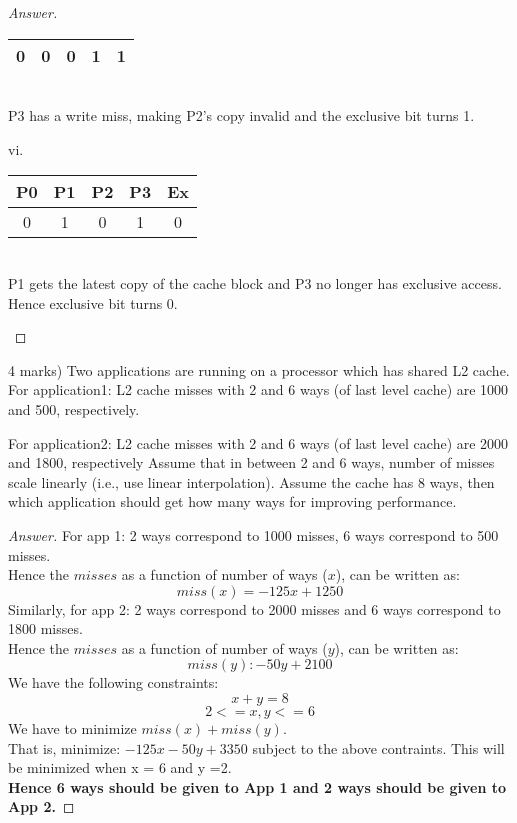 \documentclass[12pt]{article}
\newenvironment{exercise}[2][Exercise]{\begin{trivlist}
\item[\hskip \labelsep {\bfseries #1}\hskip \labelsep {\bfseries #2.}]}{\end{trivlist}}
\begin{document}
\begin{proof}[Answer]
\begin{center}
\begin{tabular}{|| c c c c c||}
		\hline \hline
		0 & 0 & 0 & 1 & 1 \\ \hline
		\end{tabular}
	\\ P3 has a write miss, making P2's copy invalid and the exclusive bit turns 1.
	\end{center}
	\begin{center}
		vi.
		\begin{tabular}{|| c c c c c||}
		\hline
		P0 & P1 & P2 & P3 & Ex \\ [0.5ex]
		\hline \hline
		0 & 1 & 0 & 1 & 0 \\ \hline
		\end{tabular}
\\ P1 gets the latest copy of the cache block and P3 no longer has exclusive access. Hence exclusive bit turns 0.
	\end{center}

\end{proof}

\begin{exercise}[Question]{6}
(4 marks) Two applications are running on a processor which has shared L2
cache.
For application1: L2 cache misses with 2 and 6 ways (of last level cache) are 1000
and 500, respectively.

For application2: L2 cache misses with 2 and 6 ways (of last level cache) are 2000
and 1800, respectively
Assume that in between 2 and 6 ways, number of misses scale linearly (i.e., use
linear interpolation).
Assume the cache has 8 ways, then which application should get how many ways
for improving performance.
\end{exercise}

\begin{proof}[Answer]
	For app 1: 2 ways correspond to  1000 misses, 6 ways correspond to 500 misses. \\ Hence the $misses$ as a function of number of ways ($x$), can be written as: \[ miss(x) = -125x +1250 \] %
Similarly, for app 2: 2 ways correspond to 2000 misses and 6 ways correspond to 1800 misses. \\ Hence the $misses$ as a function of number of ways ($y$), can be written as: \[ miss(y): -50y + 2100 \] %
We have the following constraints: \[ x+y=8 \] \[2 <= x, y <= 6  \]
We have to minimize $miss(x) + miss(y)$. \\
That is, minimize: $-125x -50y + 3350$ subject to the above contraints. This will be minimized when x = 6 and y =2. \\ \textbf{Hence 6 ways should be given to App 1 and 2 ways should be given to App 2.}

\end{proof}
 
\end{document}
